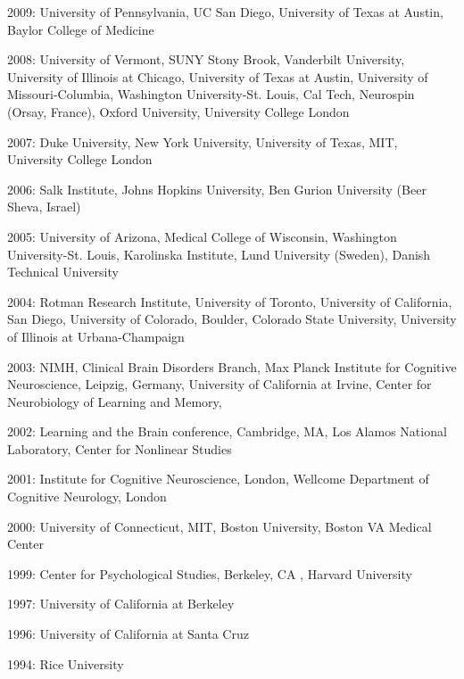 2009:  University of Pennsylvania, UC San Diego, University of Texas at Austin, Baylor College of Medicine\vspace{2mm}

2008:  University of Vermont, SUNY Stony Brook, Vanderbilt University, University of Illinois at Chicago, University of Texas at Austin, University of Missouri-Columbia, Washington University-St. Louis, Cal Tech, Neurospin (Orsay, France), Oxford University, University College London\vspace{2mm}

2007:  Duke University, New York University, University of Texas, MIT, University College London\vspace{2mm}

2006:  Salk  Institute, Johns Hopkins University, Ben Gurion University (Beer Sheva, Israel)\vspace{2mm}

2005:  University of Arizona, Medical College of Wisconsin, Washington University-St. Louis, Karolinska Institute, Lund University (Sweden), Danish Technical University\vspace{2mm}

2004:  Rotman Research Institute, University of Toronto, University of California, San Diego, University of Colorado, Boulder, Colorado State University, University of Illinois at Urbana-Champaign\vspace{2mm}

2003:  NIMH, Clinical Brain Disorders Branch, Max Planck Institute for Cognitive Neuroscience, Leipzig, Germany, University of California at Irvine, Center for Neurobiology of Learning and Memory,\vspace{2mm}

2002:  Learning and the Brain conference, Cambridge, MA, Los Alamos National Laboratory, Center for Nonlinear Studies\vspace{2mm}

2001:  Institute for Cognitive Neuroscience, London,  Wellcome Department of Cognitive Neurology, London\vspace{2mm}

2000:  University of Connecticut, MIT, Boston University, Boston VA Medical Center\vspace{2mm}

1999:  Center for Psychological Studies, Berkeley, CA , Harvard University\vspace{2mm}

1997:  University of California at Berkeley \vspace{2mm}

1996:  University of California at Santa Cruz \vspace{2mm}

1994:  Rice University \vspace{2mm}

